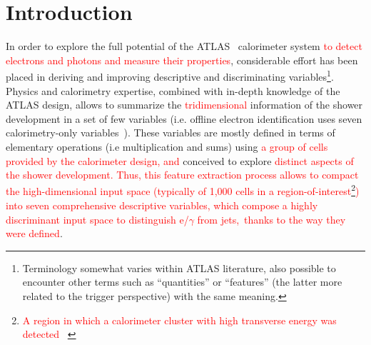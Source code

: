\chapter{Introduction}



In order to explore the full potential of the ATLAS~\cite{PERF-2007-01}
calorimeter system \textcolor{red}{to detect electrons
and photons and measure their properties}, considerable effort has been placed in deriving and
improving descriptive and discriminating variables\footnote{Terminology somewhat
  varies within ATLAS literature, also possible to encounter other terms such
as ``quantities'' or ``features'' (the latter more related to the trigger
perspective) with the same meaning.}. Physics and calorimetry expertise,
combined with in-depth knowledge of the ATLAS design, allows to summarize the \textcolor{red}{tridimensional} information of the shower development in a set of few
variables (i.e. offline electron identification uses seven calorimetry-only
variables~\cite{aaboud2019electron}). These variables are mostly defined in
terms of elementary operations (i.e multiplication and sums) using \textcolor{red}{a group of cells provided by the calorimeter
design, and} conceived to explore
\textcolor{red}{distinct aspects of the shower development. Thus, this feature extraction process allows to
compact the high-dimensional input space (typically of 1,000 cells in a region-of-interest\textcolor{red}{\footnote{\textcolor{red}{A region in which a calorimeter cluster with high transverse energy was detected ~\cite{CERN-LHCC-2017-020}}}}) into seven comprehensive descriptive variables, which compose a highly discriminant input space to distinguish e/$\gamma$ from jets, thanks to the way they were defined}.


